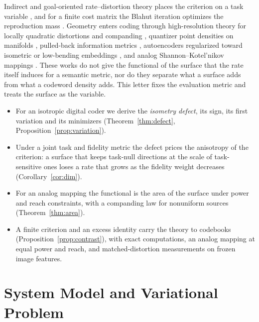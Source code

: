\documentclass[journal]{IEEEtran}
\begin{document}
Indirect and goal-oriented rate--distortion theory places the criterion on a task variable \cite{liu2022indirect,stavrou,Guo_2026}, and for a finite cost matrix the Blahut iteration optimizes the reproduction mass \cite{blahut1972computation,Han_2025,yang_sandwich}. Geometry enters coding through high-resolution theory for locally quadratic distortions and companding \cite{linder1999high,linder1999companding}, quantizer point densities on manifolds \cite{iacobelli2016quantization}, pulled-back information metrics \cite{arvanitidis2022pullinginformationgeometry,park2026informationgeometrysoftmaxprobing}, autoencoders regularized toward isometric or low-bending embeddings \cite{kato,braunsmann}, and analog Shannon--Kotel'nikov mappings \cite{hekland2009shannon}. These works do not give the functional of the surface that the rate itself induces for a semantic metric, nor do they separate what a surface adds from what a codeword density adds. This letter fixes the evaluation metric and treats the surface as the variable.
\begin{itemize}
\item For an isotropic digital coder we derive the \emph{isometry defect}, its sign, its first variation and its minimizers (Theorem~\ref{thm:defect}, Proposition~\ref{prop:variation}).
\item Under a joint task and fidelity metric the defect prices the anisotropy of the criterion: a surface that keeps task-null directions at the scale of task-sensitive ones loses a rate that grows as the fidelity weight decreases (Corollary~\ref{cor:dim}).
\item For an analog mapping the functional is the area of the surface under power and reach constraints, with a companding law for nonuniform sources (Theorem~\ref{thm:area}).
\item A finite criterion and an excess identity carry the theory to codebooks (Proposition~\ref{prop:contrast}), with exact computations, an analog mapping at equal power and reach, and matched-distortion measurements on frozen image features.
\end{itemize}

\section{System Model and Variational Problem}
\end{document}
